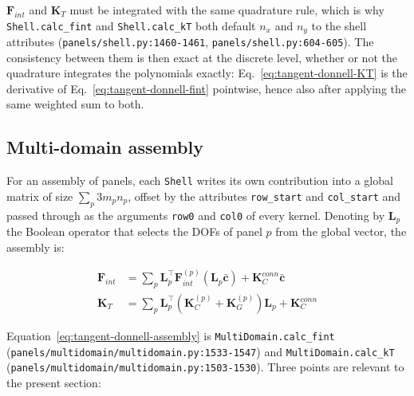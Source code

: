 $\boldsymbol{F}_{int}$ and $\boldsymbol{K}_T$ must be integrated with the same quadrature rule, which is why \texttt{Shell.calc\_fint} and \texttt{Shell.calc\_kT} both default $n_x$ and $n_y$ to the shell attributes (\texttt{panels/shell.py:1460-1461}, \texttt{panels/shell.py:604-605}). The consistency between them is then exact at the discrete level, whether or not the quadrature integrates the polynomials exactly: Eq.~\ref{eq:tangent-donnell-KT} is the derivative of Eq.~\ref{eq:tangent-donnell-fint} pointwise, hence also after applying the same weighted sum to both.

\subsection{Multi-domain assembly}\label{sec:tangent-donnell-multidomain}

For an assembly of panels, each \texttt{Shell} writes its own contribution into a global matrix of size $\sum_p 3 m_p n_p$, offset by the attributes \texttt{row\_start} and \texttt{col\_start} and passed through as the arguments \texttt{row0} and \texttt{col0} of every kernel. Denoting by $\boldsymbol{L}_p$ the Boolean operator that selects the DOFs of panel $p$ from the global vector, the assembly is:

\begin{equation}\label{eq:tangent-donnell-assembly}
	\begin{aligned}
		\boldsymbol{F}_{int} &= \sum_{p} \boldsymbol{L}_p^\top \boldsymbol{F}_{int}^{(p)}(\boldsymbol{L}_p \bar{\boldsymbol{c}}) + \boldsymbol{K}_{C}^{conn} \bar{\boldsymbol{c}} \\
		\boldsymbol{K}_T &= \sum_{p} \boldsymbol{L}_p^\top \left( \boldsymbol{K}_{C}^{(p)} + \boldsymbol{K}_{G}^{(p)} \right) \boldsymbol{L}_p + \boldsymbol{K}_{C}^{conn}
	\end{aligned}
\end{equation}

Equation~\ref{eq:tangent-donnell-assembly} is \texttt{MultiDomain.calc\_fint} (\texttt{panels/multidomain/multidomain.py:1533-1547}) and \texttt{MultiDomain.calc\_kT} (\texttt{panels/multidomain/multidomain.py:1503-1530}). Three points are relevant to the present section:

